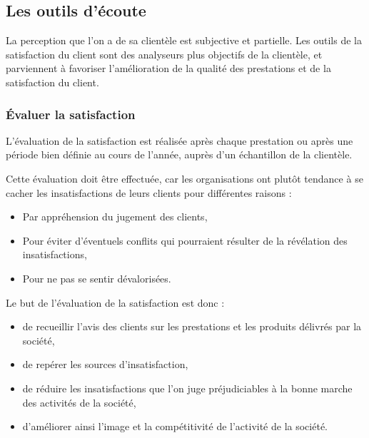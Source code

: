         \subsection[Les outils d’écoute]{Les outils d’écoute}
        La perception que l’on a de sa clientèle est subjective et partielle.
        Les outils de la satisfaction du client sont des analyseurs plus objectifs de la clientèle, 
        et parviennent à favoriser l’amélioration de la qualité des prestations et de la satisfaction du
        client.
            \subsubsection[Évaluer la satisfaction]{Évaluer la satisfaction}
            L’évaluation de la satisfaction est réalisée après chaque prestation ou après une période
            bien définie au cours de l’année, auprès d’un échantillon de la clientèle.
            \par
            Cette évaluation doit être effectuée, car les organisations ont plutôt
            tendance à se cacher les insatisfactions de leurs clients pour différentes raisons :
            \par    
                \begin{itemize}
                    \setlength{\itemsep}{0pt}
                    \item [\ding{226}] Par appréhension du jugement des clients,
                    \item [\ding{226}] Pour éviter d’éventuels conflits qui pourraient
                    résulter de la révélation des insatisfactions,
                    \item [\ding{226}] Pour ne pas se sentir dévalorisées.
                \end{itemize}
            Le but de l’évaluation de la satisfaction est donc :
            \par
                \begin{itemize}
                    \setlength{\itemsep}{0pt}
                    \item [\ding{226}] de recueillir l’avis des clients sur les prestations
                    et les produits délivrés par la société,
                    \item [\ding{226}] de repérer les sources d’insatisfaction,
                    \item [\ding{226}] de réduire les insatisfactions que l’on juge
                    préjudiciables à la bonne marche des activités de la société,
                    \item [\ding{226}] d’améliorer ainsi l’image et la compétitivité de l’activité
                    de la société.
                \end{itemize}
